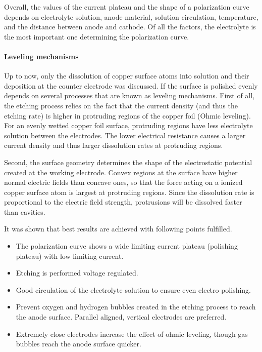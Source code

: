 Overall, the values of the current plateau and the shape of a polarization curve depends on electrolyte solution, anode material, solution circulation, temperature, and the distance between anode and cathode. Of all the factors, the electrolyte is the most important one determining the polarization curve.

\paragraph{Leveling mechanisms}
Up to now, only the dissolution of copper surface atoms into solution and their deposition at the counter electrode was discussed. If the surface is polished evenly depends on several processes that are known as leveling mechanisms. First of all, the etching process relies on the fact that the current density (and thus the etching rate) is higher in protruding regions of the copper foil (Ohmic leveling). For an evenly wetted copper foil surface, protruding regions have less electrolyte solution between the electrodes. The lower electrical resistance causes a larger current density and thus larger dissolution rates at protruding regions.

Second, the surface geometry determines the shape of the electrostatic potential created at the working electrode. Convex regions at the surface have higher normal electric fields than concave ones, so that the force acting on a ionized copper surface atom is largest at protruding regions. Since the dissolution rate is proportional to the electric field strength, protrusions will be dissolved faster than cavities.\cite{jinshan_electrochemical_2004, Huo_Electrochemistry_2007, luo_effect_2011}

It was shown that best results are achieved with following points fulfilled.\cite{Huo_Electrochemical_2003}
\begin{itemize}
	\item The polarization curve shows a wide limiting current plateau (polishing plateau) with low limiting current.
	\item Etching is performed voltage regulated.
	\item Good circulation of the electrolyte solution to ensure even electro polishing.
	\item Prevent oxygen and hydrogen bubbles created in the etching process to reach the anode surface. Parallel aligned, vertical electrodes are preferred.
	\item Extremely close electrodes increase the effect of ohmic leveling, though gas bubbles reach the anode surface quicker.
\end{itemize}

